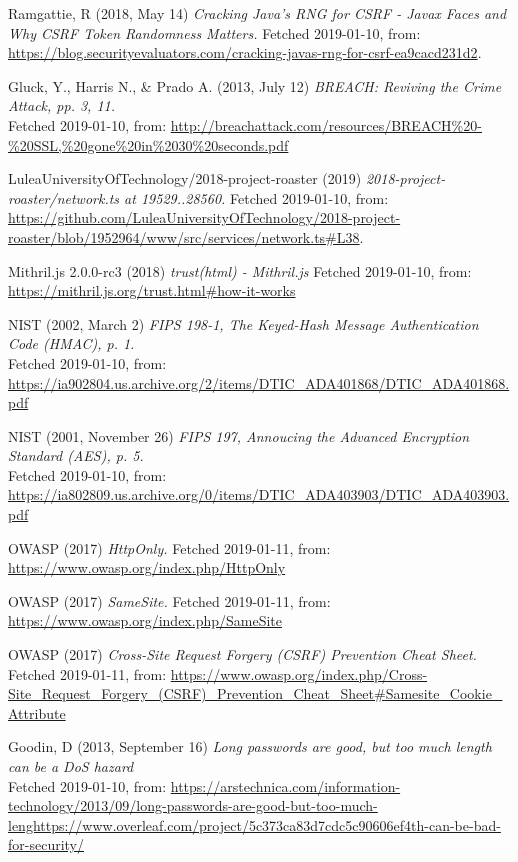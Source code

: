 \documentclass[12pt,a4paper]{report}
\begin{document}
{\RaggedRight\begin{thebibliography}{1}

Ramgattie, R (2018, May 14) {\em  Cracking Java’s RNG for CSRF - Javax Faces and Why CSRF Token Randomness Matters.}
Fetched 2019-01-10, from:
\url{https://blog.securityevaluators.com/cracking-javas-rng-for-csrf-ea9cacd231d2}.

Gluck, Y., Harris N., \& Prado A. (2013, July 12) {\em BREACH: Reviving the Crime Attack, pp. 3, 11.} \\
Fetched 2019-01-10, from:
\url{http://breachattack.com/resources/BREACH%20-%20SSL,%20gone%20in%2030%20seconds.pdf}

LuleaUniversityOfTechnology/2018-project-roaster (2019) {\em 2018-project-roaster/network.ts at 19529..28560.}
Fetched 2019-01-10, from:
\url{https://github.com/LuleaUniversityOfTechnology/2018-project-roaster/blob/1952964/www/src/services/network.ts#L38}.

Mithril.js 2.0.0-rc3 (2018) {\em trust(html) - Mithril.js}
Fetched 2019-01-10, from:
\url{https://mithril.js.org/trust.html#how-it-works}

NIST (2002, March 2) {\em FIPS 198-1, The Keyed-Hash Message Authentication Code (HMAC), p. 1.} \\
Fetched 2019-01-10, from:
\url{https://ia902804.us.archive.org/2/items/DTIC_ADA401868/DTIC_ADA401868.pdf}

NIST (2001, November 26) {\em FIPS 197, Annoucing the Advanced Encryption Standard (AES), p. 5.} \\
Fetched 2019-01-10, from:
\url{https://ia802809.us.archive.org/0/items/DTIC_ADA403903/DTIC_ADA403903.pdf}

OWASP (2017) {\em HttpOnly.} Fetched 2019-01-11, from:
\url{https://www.owasp.org/index.php/HttpOnly}

OWASP (2017) {\em SameSite.} Fetched 2019-01-11, from:
\url{https://www.owasp.org/index.php/SameSite}

OWASP (2017) {\em Cross-Site Request Forgery (CSRF) Prevention Cheat Sheet.} Fetched 2019-01-11, from:
\url{https://www.owasp.org/index.php/Cross-Site_Request_Forgery_(CSRF)_Prevention_Cheat_Sheet#Samesite_Cookie_Attribute}

Goodin, D (2013, September 16) {\em Long passwords are good, but too much length can be a DoS hazard} \\
Fetched 2019-01-10, from:
\url{https://arstechnica.com/information-technology/2013/09/long-passwords-are-good-but-too-much-lenghttps://www.overleaf.com/project/5c373ca83d7cdc5c90606ef4th-can-be-bad-for-security/}


\end{thebibliography}}
\end{document}
